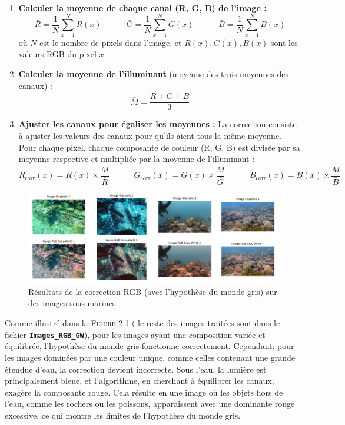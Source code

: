 \documentclass[10pt, a4paper]{extarticle}
\numberwithin{equation}{section}
\numberwithin{figure}{section}
\begin{document}
\begin{enumerate}
    \item \textbf{Calculer la moyenne de chaque canal (R, G, B) de l'image :}
    $$
    \bar{R} = \frac{1}{N} \sum_{x=1}^{N} R(x) \quad\quad\quad \bar{G} = \frac{1}{N} \sum_{x=1}^{N} G(x) \quad\quad\quad \bar{B} = \frac{1}{N} \sum_{x=1}^{N} B(x)
    $$
    où \( N \) est le nombre de pixels dans l'image, et \( R(x), G(x), B(x) \) sont les valeurs RGB du pixel \( x \).
    
    \item \textbf{Calculer la moyenne de l'illuminant} (moyenne des trois moyennes des canaux) :
    \[
    \bar{M} = \frac{\bar{R} + \bar{G} + \bar{B}}{3}
    \]

    \item \textbf{Ajuster les canaux pour égaliser les moyennes :} La correction consiste à ajuster les valeurs des canaux pour qu'ils aient tous la même moyenne. Pour chaque pixel, chaque composante de couleur (R, G, B) est divisée par sa moyenne respective et multipliée par la moyenne de l'illuminant :
    $$
    R_{\text{corr}}(x) = R(x) \times \frac{\bar{M}}{\bar{R}} \quad\quad\quad G_{\text{corr}}(x) = G(x) \times \frac{\bar{M}}{\bar{G}} \quad\quad\quad B_{\text{corr}}(x) = B(x) \times \frac{\bar{M}}{\bar{B}}
    $$
\end{enumerate}

\begin{figure}[h!]
\begin{center}
\includegraphics[width=18cm]{image004.png}
\end{center}
\label{figure2.1}
\caption{Résultats de la correction RGB (avec l'hypothèse du monde gris) sur des images sous-marines}
\end{figure} 

Comme illustré dans la \hyperref[figure2.1]{\textsc{Figure} 2.1} ( le reste des images traitées sont dans le fichier \colorbox{gray!15}{\texttt{\textbf{Images\_RGB\_GW}}}), pour les images ayant une composition variée et équilibrée, l'hypothèse du monde gris fonctionne correctement. Cependant, pour les images dominées par une couleur unique, comme celles contenant une grande étendue d'eau, la correction devient incorrecte. Sous l'eau, la lumière est principalement bleue, et l'algorithme, en cherchant à équilibrer les canaux, exagère la composante rouge. Cela résulte en une image où les objets hors de l'eau, comme les rochers ou les poissons, apparaissent avec une dominante rouge excessive, ce qui montre les limites de l'hypothèse du monde gris.
\end{document}
